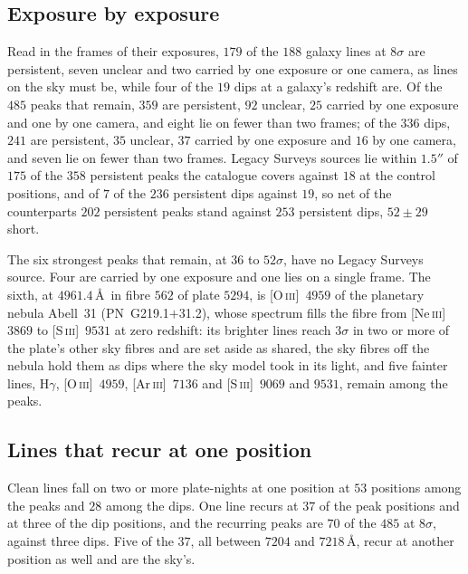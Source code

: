 \documentclass[3p,11pt]{elsarticle}
\begin{document}
\subsection{Exposure by exposure}

Read in the frames of their exposures, $179$ of the $188$ galaxy lines at $8\sigma$ are
persistent, seven unclear and two carried by one exposure or one camera, as lines on the
sky must be, while four of the $19$ dips at a galaxy's redshift are. Of the $485$ peaks
that remain, $359$ are persistent, $92$ unclear, $25$ carried by one exposure and one by
one camera, and eight lie on fewer than two frames; of the $336$ dips, $241$ are
persistent, $35$ unclear, $37$ carried by one exposure and $16$ by one camera, and seven
lie on fewer than two frames. Legacy Surveys sources lie within $1.5''$ of $175$ of the
$358$ persistent peaks the catalogue covers against $18$ at the control positions, and of
$7$ of the $236$ persistent dips against $19$, so net of the counterparts $202$ persistent
peaks stand against $253$ persistent dips, $52\pm29$ short.

The six strongest peaks that remain, at $36$ to $52\sigma$, have no Legacy Surveys source.
Four are carried by one exposure and one lies on a single frame. The sixth, at
$4961.4$\,\AA\ in fibre $562$ of plate $5294$, is [O\,\textsc{iii}]~$4959$ of the
planetary nebula Abell~31 (PN~G219.1$+$31.2), whose spectrum fills the fibre from
[Ne\,\textsc{iii}]~$3869$ to [S\,\textsc{iii}]~$9531$ at zero redshift: its brighter lines
reach $3\sigma$ in two or more of the plate's other sky fibres and are set aside as shared,
the sky fibres off the nebula hold them as dips where the sky model took in its light, and
five fainter lines, H$\gamma$, [O\,\textsc{iii}]~$4959$, [Ar\,\textsc{iii}]~$7136$ and
[S\,\textsc{iii}]~$9069$ and $9531$, remain among the peaks.

\subsection{Lines that recur at one position}

Clean lines fall on two or more plate-nights at one position at $53$ positions among the
peaks and $28$ among the dips. One line recurs at $37$ of the peak positions and at three
of the dip positions, and the recurring peaks are $70$ of the $485$ at $8\sigma$, against
three dips. Five of the $37$, all between $7204$ and $7218$\,\AA, recur at another position
as well and are the sky's.
\end{document}
